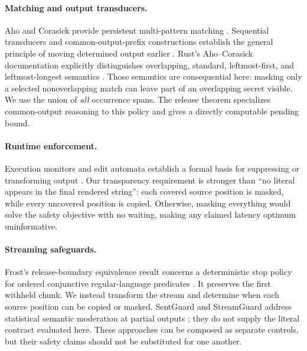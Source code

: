 \documentclass[11pt,a4paper]{article}
\begin{document}
\paragraph{Matching and output transducers.}
Aho and Corasick provide persistent multi-pattern matching \cite{aho}. Sequential transducers and common-output-prefix constructions establish the general principle of moving determined output earlier \cite{mohri}. Rust's Aho--Corasick documentation explicitly distinguishes overlapping, standard, leftmost-first, and leftmost-longest semantics \cite{rustac}. Those semantics are consequential here: masking only a selected nonoverlapping match can leave part of an overlapping secret visible. We use the union of \emph{all} occurrence spans. The release theorem specializes common-output reasoning to this policy and gives a directly computable pending bound.

\paragraph{Runtime enforcement.}
Execution monitors and edit automata establish a formal basis for suppressing or transforming output \cite{schneider,ligatti}. Our transparency requirement is stronger than ``no literal appears in the final rendered string'': each covered source position is masked, while every uncovered position is copied. Otherwise, masking everything would solve the safety objective with no waiting, making any claimed latency optimum uninformative.

\paragraph{Streaming safeguards.}
Frost's release-boundary equivalence result concerns a deterministic stop policy for ordered conjunctive regular-language predicates \cite{frost}. It preserves the first withheld chunk. We instead transform the stream and determine when each source position can be copied or masked. SentGuard and StreamGuard address statistical semantic moderation at partial outputs \cite{sentguard,streamguard}; they do not supply the literal contract evaluated here. These approaches can be composed as separate controls, but their safety claims should not be substituted for one another.
\end{document}
